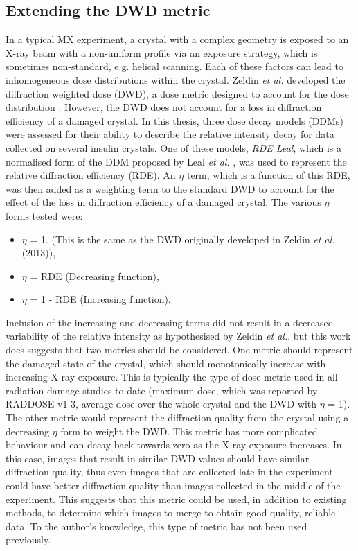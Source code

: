 \subsection{Extending the DWD metric}
\label{sub:Extending the DWD metric}
In a typical MX experiment, a crystal with a complex geometry is exposed to an X-ray beam with a non-uniform profile via an exposure strategy, which is sometimes non-standard, e.g. helical scanning.
Each of these factors can lead to inhomogeneous dose distributions within the crystal.
Zeldin \textit{et al.} developed the diffraction weighted dose (DWD), a dose metric designed to account for the dose distribution \cite{zeldin2013dwd}.
However, the DWD does not account for a loss in diffraction efficiency of a damaged crystal.
In this thesis, three dose decay models  (DDMs) were assessed for their ability to describe the relative intensity decay for data collected on several insulin crystals.
One of these models, \textit{RDE Leal}, which is a normalised form of the DDM proposed by Leal \textit{et al.} \cite{leal2012}, was used to represent the relative diffraction efficiency (RDE).
An $\eta$ term, which is a function of this RDE, was then added as a weighting term to the standard DWD to account for the effect of the loss in diffraction efficiency of a damaged crystal.
The various $\eta$ forms tested were:
\begin{itemize}
    \item $\eta$ = 1. (This is the same as the DWD originally developed in Zeldin \textit{et al.} (2013)),
    \item $\eta$ = RDE (Decreasing function),
    \item $\eta$ = 1 - RDE (Increasing function).
\end{itemize}
Inclusion of the increasing and decreasing terms did not result in a decreased variability of the relative intensity as hypothesised by Zeldin \textit{et al.}, but this work does suggests that two metrics should be considered.
One metric should represent the damaged state of the crystal, which should monotonically increase with increasing X-ray exposure.
This is typically the type of dose metric used in all radiation damage studies to date (maximum dose, which was reported by RADDOSE v1-3, average dose over the whole crystal and the DWD with $\eta$ = 1).
The other metric would represent the diffraction quality from the crystal using a decreasing $\eta$ form to weight the DWD.
This metric has more complicated behaviour and can decay back towards zero as the X-ray exposure increases.
In this case, images that result in similar DWD values should have similar diffraction quality, thus even images that are collected late in the experiment could have better diffraction quality than images collected in the middle of the experiment.
This suggests that this metric could be used, in addition to existing methods, to determine which images to merge to obtain good quality, reliable data.
To the author's knowledge, this type of metric has not been used previously.

